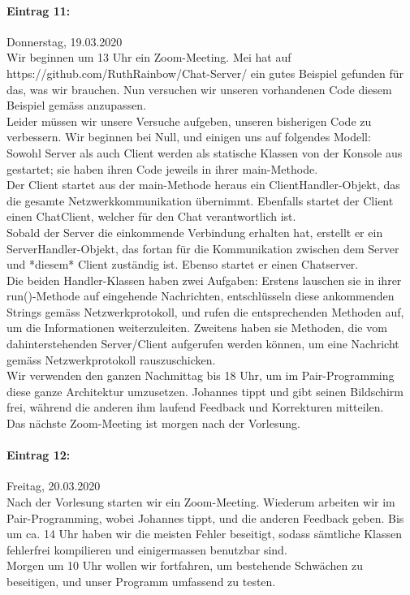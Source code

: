 \documentclass[12pt]{article}
\begin{document}
\paragraph{Eintrag 11:}
Donnerstag, 19.03.2020\\
Wir beginnen um 13 Uhr ein Zoom-Meeting. Mei hat auf\\ https://github.com/RuthRainbow/Chat-Server/ ein gutes Beispiel gefunden f\"ur das, was wir brauchen. Nun versuchen wir unseren vorhandenen Code diesem Beispiel gem\"ass anzupassen.\\
Leider m\"ussen wir unsere Versuche aufgeben, unseren bisherigen Code zu verbessern. Wir beginnen bei Null, und einigen uns auf folgendes Modell:\\
Sowohl Server als auch Client werden als statische Klassen von der Konsole aus gestartet; sie haben ihren Code jeweils in ihrer main-Methode.\\
Der Client startet aus der main-Methode heraus ein ClientHandler-Objekt, das die gesamte Netzwerkkommunikation \"ubernimmt. Ebenfalls startet der Client einen ChatClient, welcher f\"ur den Chat verantwortlich ist.\\
Sobald der Server die einkommende Verbindung erhalten hat, erstellt er ein ServerHandler-Objekt, das fortan für die Kommunikation zwischen dem Server und *diesem* Client zust\"andig ist. Ebenso startet er einen Chatserver.\\
Die beiden Handler-Klassen haben zwei Aufgaben: Erstens lauschen sie in ihrer run()-Methode auf eingehende Nachrichten, entschl\"usseln diese ankommenden Strings gem\"ass Netzwerkprotokoll, und rufen die entsprechenden Methoden auf, um die Informationen weiterzuleiten. Zweitens haben sie Methoden, die vom dahinterstehenden Server/Client aufgerufen werden k\"onnen, um eine Nachricht gem\"ass Netzwerkprotokoll rauszuschicken.\\
Wir verwenden den ganzen Nachmittag bis 18 Uhr, um im Pair-Programming diese ganze Architektur umzusetzen. Johannes tippt und gibt seinen Bildschirm frei, während die anderen ihm laufend Feedback und Korrekturen mitteilen.\\
Das n\"achste Zoom-Meeting ist morgen nach der Vorlesung.

\paragraph{Eintrag 12:}
Freitag, 20.03.2020\\
Nach der Vorlesung starten wir ein Zoom-Meeting. Wiederum arbeiten wir im Pair-Programming, wobei Johannes tippt, und die anderen Feedback geben. Bis um ca. 14 Uhr haben wir die meisten Fehler beseitigt, sodass s\"amtliche Klassen fehlerfrei kompilieren und einigermassen benutzbar sind.\\
Morgen um 10 Uhr wollen wir fortfahren, um bestehende Schw\"achen zu beseitigen, und unser Programm umfassend zu testen.
\end{document}
